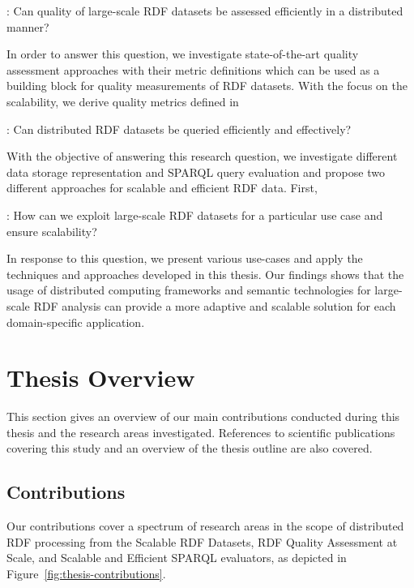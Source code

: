 \begin{tcolorbox}
\textbf{\rqNr[RQ2]\label{rq:2}}: Can quality of large-scale RDF datasets be assessed efficiently in a distributed manner?
\end{tcolorbox}

In order to answer this question, we investigate state-of-the-art quality assessment approaches with their metric definitions which can be used as a building block for quality measurements of RDF datasets.
With the focus on the scalability, we derive quality metrics defined in~\cite{zaveri2015quality} 


\begin{tcolorbox}
\textbf{\rqNr[RQ3]\label{rq:3}}: Can distributed RDF datasets be queried efficiently and effectively?
\end{tcolorbox}

With the objective of answering this research question, we investigate different data storage representation and SPARQL query evaluation and propose two different approaches for scalable and efficient RDF data.
First, 

\begin{tcolorbox}
\textbf{\rqNr[RQ4]\label{rq:4}}: How can we exploit large-scale RDF datasets for a particular use case and ensure scalability?
\end{tcolorbox}

In response to this question, we present various use-cases and apply the techniques and approaches developed in this thesis.
Our findings shows that the usage of distributed computing frameworks and semantic technologies for large-scale RDF analysis can provide a more adaptive and scalable solution for each domain-specific application.

\section{Thesis Overview}
\label{sec:thesis-overview}
This section gives an overview of our main contributions conducted during this thesis and the research areas investigated.
References to scientific publications covering this study and an overview of the thesis outline are also covered.

\subsection{Contributions}
Our contributions cover a spectrum of research areas in the scope of distributed RDF processing from the Scalable RDF Datasets, RDF Quality Assessment at Scale, and Scalable and Efficient SPARQL evaluators, as depicted in Figure~\ref{fig:thesis-contributions}.

